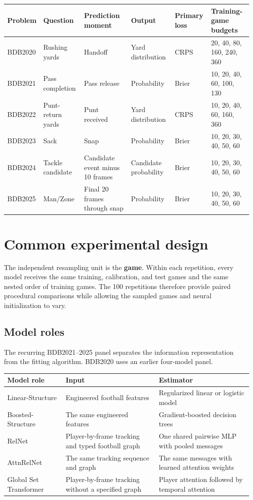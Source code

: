 \documentclass[10pt,letterpaper]{article}
\begin{document}
\footnotesize
\setlength{\tabcolsep}{4pt}
\begin{tabularx}{\textwidth}{@{}lYlllY@{}}
\toprule
Problem & Question & Prediction moment & Output & Primary loss & Training-game budgets \\
\midrule
BDB2020 & Rushing yards & Handoff & Yard distribution & CRPS & 20, 40, 80, 160, 240, 360 \\
BDB2021 & Pass completion & Pass release & Probability & Brier & 10, 20, 40, 60, 100, 130 \\
BDB2022 & Punt-return yards & Punt received & Yard distribution & CRPS & 10, 20, 40, 60, 160, 360 \\
BDB2023 & Sack & Snap & Probability & Brier & 10, 20, 30, 40, 50, 60 \\
BDB2024 & Tackle candidate & Candidate event minus 10 frames & Candidate probability & Brier & 10, 20, 30, 40, 50, 60 \\
BDB2025 & Man/Zone & Final 20 frames through snap & Probability & Brier & 10, 20, 30, 40, 50, 60 \\
\bottomrule
\end{tabularx}
\normalsize

\clearpage
\section{Common experimental design}

The independent resampling unit is the \textbf{game}. Within each repetition, every model receives the same training, calibration, and test games and the same nested order of training games. The 100 repetitions therefore provide paired procedural comparisons while allowing the sampled games and neural initialization to vary.

\subsection*{Model roles}

The recurring BDB2021--2025 panel separates the information representation from the fitting algorithm. BDB2020 uses an earlier four-model panel.

\small
\begin{tabularx}{\textwidth}{@{}P{3.1cm}P{4.3cm}Y@{}}
\toprule
Model role & Input & Estimator \\
\midrule
Linear-Structure & Engineered football features & Regularized linear or logistic model \\
Boosted-Structure & The same engineered features & Gradient-boosted decision trees \\
RelNet & Player-by-frame tracking and typed football graph & One shared pairwise MLP with pooled messages \\
AttnRelNet & The same tracking sequence and graph & The same messages with learned attention weights \\
Global Set Transformer & Player-by-frame tracking without a specified graph & Player attention followed by temporal attention \\
\bottomrule
\end{tabularx}
\normalsize
\end{document}
